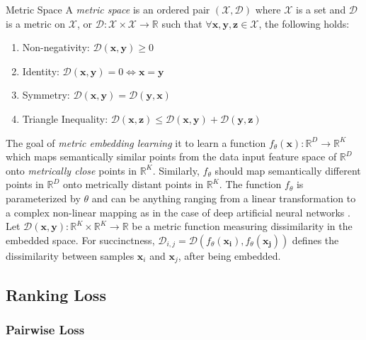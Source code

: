  \theoremstyle{definition}
 \begin{definition}{Metric Space}
 A \textit{metric space} is an ordered pair $(\mathcal{X},\mathcal{D})$ where $\mathcal{X}$ is a set and $\mathcal{D}$ is a metric on $\mathcal{X}$, or $\mathcal{D}:\mathcal{X} \times \mathcal{X} \rightarrow \mathbb{R}$ such that $\forall \bm{x},\bm{y},\bm{z}\in\mathcal{X}$, the following holds:

 \end{definition}
 	\begin{enumerate}
	\item Non-negativity: $\mathcal{D}(\bm{x},\bm{y}) \geq 0$
	\item Identity: $\mathcal{D}(\bm{x},\bm{y}) = 0 \iff \bm{x} = \bm{y} $
	\item Symmetry: $\mathcal{D}(\bm{x},\bm{y}) = \mathcal{D}(\bm{y},\bm{x})$
	\item Triangle Inequality:  $\mathcal{D}(\bm{x},\bm{z}) \leq \mathcal{D}(\bm{x},\bm{y}) + \mathcal{D}(\bm{y},\bm{z})$
	\end{enumerate}

The goal of \textit{metric embedding learning} it to learn a function $f_{\theta}(\bm{x}):\mathbb{R}^{D} \rightarrow \mathbb{R}^{K}$ which maps semantically similar points from the data input feature space of $\mathbb{R}^{D}$ onto \textit{metrically close} points in $\mathbb{R}^{K}$.  Similarly, $f_{\theta}$ should map semantically different points in $\mathbb{R}^{D}$ onto metrically distant points in $\mathbb{R}^{K}$.  The function $f_{\theta}$ is parameterized by $\theta$ and can be anything ranging from a linear transformation to a complex non-linear mapping as in the case of deep artificial neural networks \cite{Hermans2017DefenseTripletLoss}.  Let $\mathcal{D}(\bm{x},\bm{y}): \mathbb{R}^{K} \times \mathbb{R}^{K} \rightarrow \mathbb{R}$ be a metric function measuring dissimilarity in the embedded space.  For succinctness, $\mathcal{D}_{i,j} = \mathcal{D}(f_{\theta}(\bm{x_{i}}),f_{\theta}(\bm{x_{j}}))$
defines the dissimilarity between samples $\bm{x}_{i}$ and $\bm{x}_{j}$, after being embedded.

	\subsection{Ranking Loss}
	
	\subsubsection{Pairwise Loss}
	
